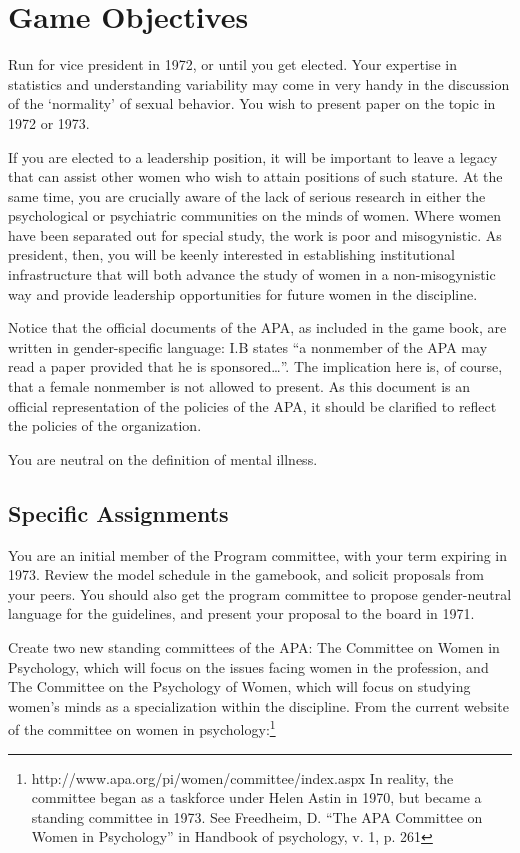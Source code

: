 \section{Game Objectives}
\label{gameobjectives}

Run for vice president in 1972, or until you get elected. Your expertise in statistics and understanding variability may come in very handy in the discussion of the `normality' of sexual behavior. You wish to present paper on the topic in 1972 or 1973.

If you are elected to a leadership position, it will be important to leave a legacy that can assist other women who wish to attain positions of such stature. At the same time, you are crucially aware of the lack of serious research in either the psychological or psychiatric communities on the minds of women. Where women have been separated out for special study, the work is poor and misogynistic. As president, then, you will be keenly interested in establishing institutional infrastructure that will both advance the study of women in a non-misogynistic way and provide leadership opportunities for future women in the discipline.

Notice that the official documents of the APA, as included in the game book, are written in gender-specific language: I.B states ``a nonmember of the APA may read a paper provided that he is sponsored{\ldots}''. The implication here is, of course, that a female nonmember is not allowed to present. As this document is an official representation of the policies of the APA, it should be clarified to reflect the policies of the organization.

You are neutral on the definition of mental illness. 

\subsection{Specific Assignments}
\label{specificassignments}

You are an initial member of the Program committee, with your term expiring in 1973. Review the model schedule in the gamebook, and solicit proposals from your peers. You should also get the program committee to propose gender-neutral language for the guidelines, and present your proposal to the board in 1971. 

Create two new standing committees of the APA: The Committee on Women in Psychology, which will focus on the issues facing women in the profession, and The Committee on the Psychology of Women, which will focus on studying women's minds as a specialization within the discipline. From the current website of the committee on women in psychology:\footnote{http:\slash \slash www.apa.org\slash pi\slash women\slash committee\slash index.aspx In reality, the committee began as a taskforce under Helen Astin in 1970, but became a standing committee in 1973. See Freedheim, D. ``The APA Committee on Women in Psychology'' in Handbook of psychology, v. 1, p. 261}

